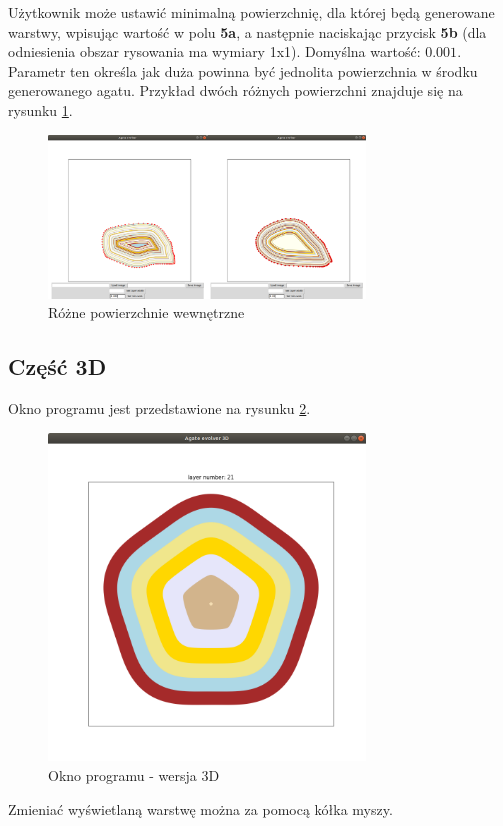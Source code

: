\documentclass{article}
\begin{document}
\begin{description}
Użytkownik może ustawić minimalną powierzchnię, dla której będą generowane warstwy, wpisując wartość w polu \textbf{5a}, a następnie naciskając przycisk \textbf{5b} (dla odniesienia obszar rysowania ma wymiary 1x1). Domyślna wartość: $0.001$. Parametr ten określa jak duża powinna być jednolita powierzchnia w środku generowanego agatu. Przykład dwóch różnych powierzchni znajduje się na rysunku \ref{rozne_powierzchnie_wewnetrzne}.
\begin{figure}[H]
\caption{Różne powierzchnie wewnętrzne}
\label{rozne_powierzchnie_wewnetrzne}
\centering
\includegraphics[width=0.75\textwidth]{obrazy/rozne_powierzchnie_wewnetrzne.png}
\end{figure}
\end{description}
\subsection{Część 3D}
Okno programu jest przedstawione na rysunku \ref{okno_programu_3d}.
\begin{figure}[H]
\caption{Okno programu - wersja 3D}
\label{okno_programu_3d}
\centering
\includegraphics[width=0.75\textwidth]{obrazy/okno_programu_3d.png}
\end{figure}
Zmieniać wyświetlaną warstwę można za pomocą kółka myszy.
\end{document}
